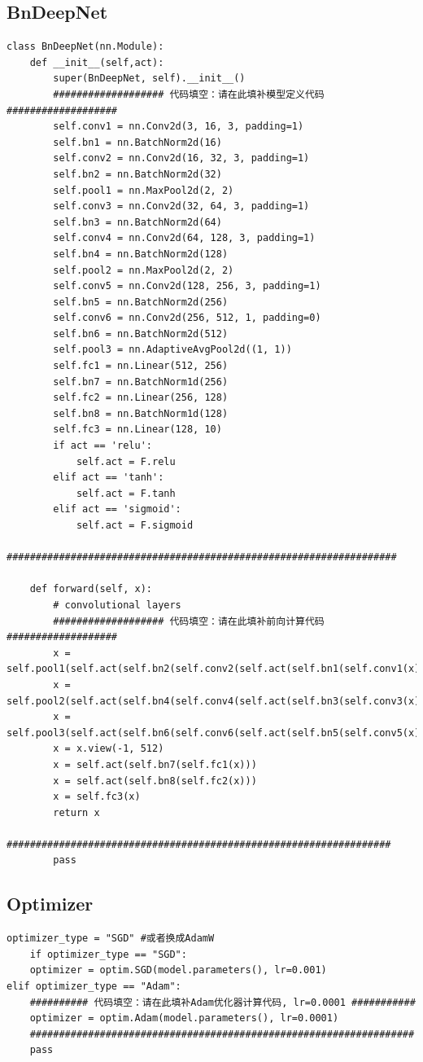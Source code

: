 \documentclass{article}%
\begin{document}
\begin{appendices}
\subsection*{BnDeepNet}
\begin{lstlisting}
class BnDeepNet(nn.Module):
    def __init__(self,act):
        super(BnDeepNet, self).__init__()
        ################### 代码填空：请在此填补模型定义代码 ###################
        self.conv1 = nn.Conv2d(3, 16, 3, padding=1)
        self.bn1 = nn.BatchNorm2d(16)
        self.conv2 = nn.Conv2d(16, 32, 3, padding=1)
        self.bn2 = nn.BatchNorm2d(32)
        self.pool1 = nn.MaxPool2d(2, 2)
        self.conv3 = nn.Conv2d(32, 64, 3, padding=1)
        self.bn3 = nn.BatchNorm2d(64)
        self.conv4 = nn.Conv2d(64, 128, 3, padding=1)
        self.bn4 = nn.BatchNorm2d(128)
        self.pool2 = nn.MaxPool2d(2, 2)
        self.conv5 = nn.Conv2d(128, 256, 3, padding=1)
        self.bn5 = nn.BatchNorm2d(256)
        self.conv6 = nn.Conv2d(256, 512, 1, padding=0)
        self.bn6 = nn.BatchNorm2d(512)
        self.pool3 = nn.AdaptiveAvgPool2d((1, 1))
        self.fc1 = nn.Linear(512, 256)
        self.bn7 = nn.BatchNorm1d(256)
        self.fc2 = nn.Linear(256, 128)
        self.bn8 = nn.BatchNorm1d(128)
        self.fc3 = nn.Linear(128, 10)
        if act == 'relu':
            self.act = F.relu
        elif act == 'tanh':
            self.act = F.tanh
        elif act == 'sigmoid':
            self.act = F.sigmoid
        ###################################################################

    def forward(self, x):
        # convolutional layers
        ################### 代码填空：请在此填补前向计算代码 ###################
        x = self.pool1(self.act(self.bn2(self.conv2(self.act(self.bn1(self.conv1(x)))))))
        x = self.pool2(self.act(self.bn4(self.conv4(self.act(self.bn3(self.conv3(x)))))))
        x = self.pool3(self.act(self.bn6(self.conv6(self.act(self.bn5(self.conv5(x)))))))
        x = x.view(-1, 512)
        x = self.act(self.bn7(self.fc1(x)))
        x = self.act(self.bn8(self.fc2(x)))
        x = self.fc3(x)
        return x
        ##################################################################
        pass
\end{lstlisting}

\subsection*{Optimizer}
\begin{lstlisting}
optimizer_type = "SGD" #或者换成AdamW
    if optimizer_type == "SGD":
    optimizer = optim.SGD(model.parameters(), lr=0.001)
elif optimizer_type == "Adam":
    ########## 代码填空：请在此填补Adam优化器计算代码, lr=0.0001 ###########
    optimizer = optim.Adam(model.parameters(), lr=0.0001)
    ##################################################################
    pass
\end{lstlisting}
\end{appendices}
\end{document}
